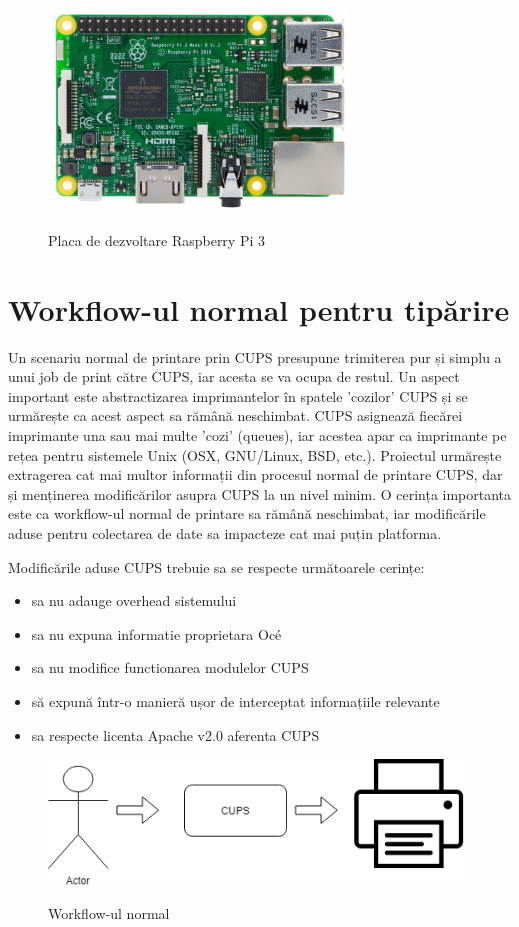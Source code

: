 \documentclass[a4paper, 12pt, twoside]{report}
\begin{document}
\begin{figure}
		\centering
			{\includegraphics[width=80mm]{rpi.png}}
		\caption{Placa de dezvoltare Raspberry Pi 3}
\end{figure}

	\section{Workflow-ul normal pentru tipărire}
Un scenariu normal de printare prin CUPS presupune trimiterea pur și simplu a unui job de print către CUPS, iar acesta se va ocupa de restul. Un aspect important este abstractizarea imprimantelor în spatele 'cozilor' CUPS și se urmărește ca acest aspect sa rămână neschimbat. CUPS asignează fiecărei imprimante una sau mai multe 'cozi' (queues), iar acestea apar ca imprimante pe rețea pentru sistemele Unix (OSX, GNU/Linux, BSD, etc.).
Proiectul urmărește extragerea cat mai multor informații din procesul normal de printare CUPS, dar și menținerea modificărilor asupra CUPS la un nivel minim. O cerința importanta este ca workflow-ul normal de printare sa rămână neschimbat, iar modificările aduse pentru colectarea de date sa impacteze cat mai puțin platforma.

Modificările aduse CUPS trebuie sa se respecte următoarele cerințe:
\begin{itemize}
\item sa nu adauge overhead sistemului
\item sa nu expuna informatie proprietara Océ
\item sa nu modifice functionarea modulelor CUPS
\item să expună într-o manieră ușor de interceptat informațiile relevante
\item sa respecte licenta Apache v2.0 aferenta CUPS
\end{itemize}


\begin{figure}[h]
		\centering
			{\includegraphics[width=110mm]{workflow.png}}
		\caption{Workflow-ul normal}
\end{figure}
\end{document}
